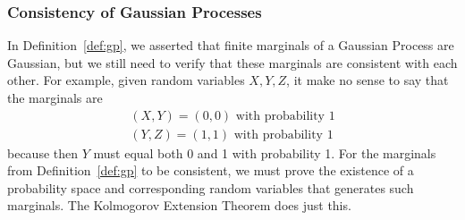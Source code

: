 \subsubsection{Consistency of Gaussian Processes}

In Definition~\ref{def:gp}, we asserted that finite marginals of a Gaussian Process are Gaussian, but we still need to verify that these marginals are consistent with each other.
For example, given random variables $X, Y, Z$, it make no sense to say that the marginals are
\begin{align*}
    (X, Y) = (0, 0) \text{ with probability 1} \\
    (Y, Z) = (1, 1) \text{ with probability 1}
\end{align*}
because then $Y$ must equal both 0 and 1 with probability 1.
For the marginals from Definition~\ref{def:gp} to be consistent, we must prove the existence of a probability space and corresponding random variables that generates such marginals.
The Kolmogorov Extension Theorem does just this.

